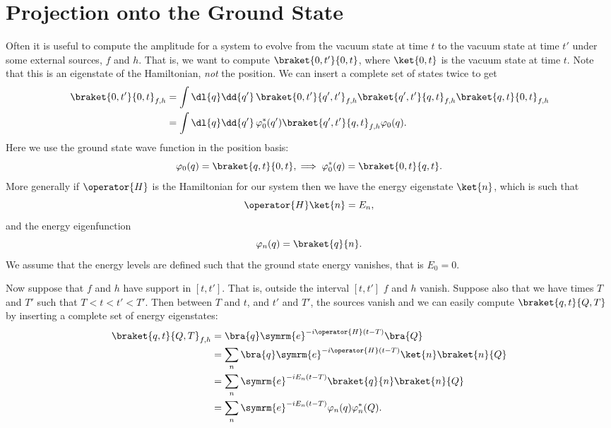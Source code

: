 \documentclass[fleqn]{NotesClass}
\newcommand{\e}{\symrm{e}}
\begin{document}
    \section{Projection onto the Ground State}
    Often it is useful to compute the amplitude for a system to evolve from the vacuum state at time \(t\) to the vacuum state at time \(t'\) under some external sources, \(f\) and \(h\).
    That is, we want to compute \(\braket{0, t'}{0, t}\), where \(\ket{0, t}\) is the vacuum state at time \(t\).
    Note that this is an eigenstate of the Hamiltonian, \emph{not} the position.
    We can insert a complete set of states twice to get
    \begin{align}
        \braket{0, t'}{0, t}_{f,h} &= \int \dl{q} \dd{q'} \, \braket{0, t'}{q', t'}_{f,h} \braket{q', t'}{q, t}_{f,h} \braket{q, t}{0, t}_{f,h}\\
        &= \int \dl{q} \dd{q'} \, \varphi_0^*(q') \braket{q', t'}{q, t}_{f,h} \varphi_0(q).
    \end{align}
    Here we use the ground state wave function in the position basis:
    \begin{equation}
        \varphi_0(q) = \braket{q, t}{0, t}, \implies \varphi_0^*(q) = \braket{0, t}{q, t}.
    \end{equation}
    More generally if \(\operator{H}\) is the Hamiltonian for our system then we have the energy eigenstate \(\ket{n}\), which is such that
    \begin{equation}
        \operator{H}\ket{n} = E_n,
    \end{equation}
    and the energy eigenfunction
    \begin{equation}
        \varphi_n(q) = \braket{q}{n}.
    \end{equation}
    We assume that the energy levels are defined such that the ground state energy vanishes, that is \(E_0 = 0\).
    
    Now suppose that \(f\) and \(h\) have support in \([t, t']\).
    That is, outside the interval \([t, t']\) \(f\) and \(h\) vanish.
    Suppose also that we have times \(T\) and \(T'\) such that \(T < t < t' < T'\).
    Then between \(T\) and \(t\), and \(t'\) and \(T'\), the sources vanish and we can easily compute \(\braket{q,t}{Q,T}\) by inserting a complete set of energy eigenstates:
    \begin{align}
        \braket{q, t}{Q, T}_{f,h} &= \bra{q} \e^{-i\operator{H}(t - T)} \bra{Q}\\
        &= \sum_n \bra{q} \e^{-i\operator{H}(t - T)} \ket{n} \braket{n}{Q}\\
        &= \sum_n \e^{-iE_n(t - T)} \braket{q}{n} \braket{n}{Q}\\
        &= \sum_n \e^{-iE_n(t - T)} \varphi_n(q) \varphi_n^*(Q).
    \end{align}
    
\end{document}
